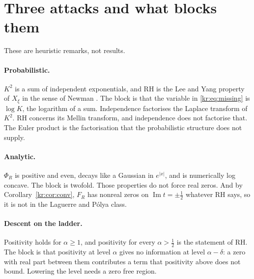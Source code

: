 \section{Three attacks and what blocks them}\label{kr:sec:attacks}
These are heuristic remarks, not results.

\paragraph{Probabilistic.} $K^2$ is a sum of independent exponentials, and RH is the Lee and Yang property of $X_\xi$ in the sense of Newman \cite{Newman1976}. The block is that the variable in \eqref{kr:eq:missing} is $\log K$, the logarithm of a sum. Independence factorises the Laplace transform of $K^2$. RH concerns its Mellin transform, and independence does not factorise that. The Euler product is the factorisation that the probabilistic structure does not supply.

\paragraph{Analytic.} $\Phi_R$ is positive and even, decays like a Gaussian in $e^{|x|}$, and is numerically log concave. The block is twofold. Those properties do not force real zeros. And by Corollary~\ref{kr:cor:conv}, $F_R$ has nonreal zeros on $\operatorname{Im}t=\pm\frac12$ whatever RH says, so it is not in the Laguerre and P\'olya class.

\paragraph{Descent on the ladder.} Positivity holds for $\alpha\ge1$, and positivity for every $\alpha>\frac12$ is the statement of RH. The block is that positivity at level $\alpha$ gives no information at level $\alpha-\delta$: a zero with real part between them contributes a term that positivity above does not bound. Lowering the level needs a zero free region.

